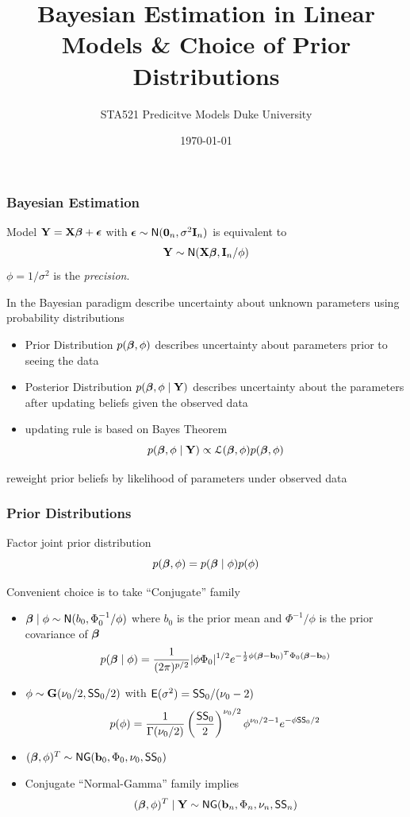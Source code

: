 \documentclass[handout]{beamer}\usepackage[]{graphicx}\usepackage[]{color}
\title{Bayesian Estimation in Linear Models \& Choice of Prior Distributions}
\institute{Merlise Clyde}
\author{STA521 Predicitve Models Duke University}
\date{\today}
\begin{document}
\maketitle

\begin{frame} \frametitle{Bayesian Estimation}
  Model $\mathbf{Y} = \mathbf{X} \boldsymbol{\beta} + \boldsymbol{\epsilon}$  with $\boldsymbol{\epsilon} \sim \textsf{N}(\mathbf{0}_n , \sigma^2
  \mathbf{I}_n)$ \pause
is equivalent to
$$
\mathbf{Y} \sim \textsf{N}(\mathbf{X} \boldsymbol{\beta}, \mathbf{I}_n/\phi)
$$
\pause
 $\phi = 1/\sigma^2$ is the {\it precision}.
\pause

\vspace{14pt}
In the  Bayesian paradigm describe uncertainty about unknown
parameters using probability distributions
\pause
\begin{itemize}
\item  Prior Distribution $p(\boldsymbol{\beta}, \phi)$ describes uncertainty about
  parameters prior to seeing the data \pause
\item Posterior Distribution $p(\boldsymbol{\beta}, \phi \mid \mathbf{Y})$ describes
  uncertainty about the parameters after updating  beliefs given the
  observed data \pause
\item updating rule is based on Bayes Theorem
$$p(\boldsymbol{\beta}, \phi \mid \mathbf{Y}) \propto {\cal{L}}(\boldsymbol{\beta}, \phi) p(\boldsymbol{\beta}, \phi)$$
\pause
\end{itemize}
 reweight prior beliefs by likelihood of parameters  under observed data
\end{frame}


\begin{frame} \frametitle{Prior Distributions}
Factor joint prior distribution  $$p(\boldsymbol{\beta}, \phi) = p(\boldsymbol{\beta} \mid \phi) p(\phi)$$
\pause

Convenient choice is to take ``Conjugate'' family \pause
\begin{itemize}
\item $\boldsymbol{\beta} \mid \phi \sim \textsf{N}(b_0, \Phi_0^{-1}/\phi)$ where $b_0$ is the prior
  mean and $\Phi^{-1}/\phi$ is the prior covariance of $\boldsymbol{\beta}$
$$
p(\boldsymbol{\beta} \mid \phi) = \frac{1}{(2 \pi)^{p/2}} | \phi \Phi_0|^{1/2} e^{- \frac{1}{2}\phi (\boldsymbol{\beta} - \mathbf{b}_0)^T \Phi_0 (\boldsymbol{\beta} - \mathbf{b}_0)}
$$
\pause
\item $\phi \sim \mathbf{G}( \nu_0/2, \textsf{SS}_0/2)$  with $\textsf{E}(\sigma^2) =
  \textsf{SS}_0/(\nu_0 - 2)$ \pause
$$p(\phi) = \frac{1}{\Gamma{(\nu_0/2)}}
\left(\frac{\textsf{SS}_0}{2} \right)^{\nu_0/2}
\phi^{\nu_0/2 - 1}
 e^{- \phi \textsf{SS}_0/2}
 $$\pause
\item $(\boldsymbol{\beta}, \phi)^T \sim \textsf{NG}(\mathbf{b}_0, \Phi_0, \nu_0, \textsf{SS}_0)$ \pause
\item Conjugate  ``Normal-Gamma'' family implies \pause
$$(\boldsymbol{\beta}, \phi)^T \mid \mathbf{Y} \sim \textsf{NG}(\mathbf{b}_n, \Phi_n, \nu_n, \textsf{SS}_n)$$
\end{itemize}
\end{frame}
\end{document}
